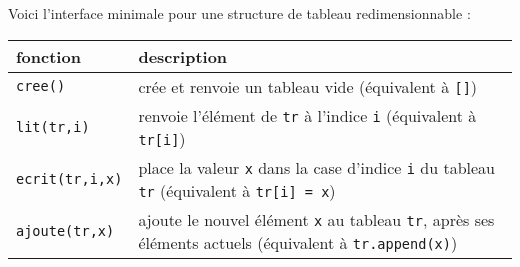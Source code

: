 \documentclass[a4paper,17pt]{extarticle}
\begin{document}
    Voici l'interface minimale pour une structure de tableau
redimensionnable :

\begin{longtable}[]{@{}ll@{}}
\toprule
\begin{minipage}[b]{0.47\columnwidth}\raggedright
fonction\strut
\end{minipage} & \begin{minipage}[b]{0.47\columnwidth}\raggedright
description\strut
\end{minipage}\tabularnewline
\midrule
\endhead
\begin{minipage}[t]{0.47\columnwidth}\raggedright
\texttt{cree()}\strut
\end{minipage} & \begin{minipage}[t]{0.47\columnwidth}\raggedright
crée et renvoie un tableau vide (équivalent à \texttt{{[}{]}})\strut
\end{minipage}\tabularnewline
\begin{minipage}[t]{0.47\columnwidth}\raggedright
\texttt{lit(tr,i)}\strut
\end{minipage} & \begin{minipage}[t]{0.47\columnwidth}\raggedright
renvoie l'élément de \texttt{tr} à l'indice \texttt{i} (équivalent à
\texttt{tr{[}i{]}})\strut
\end{minipage}\tabularnewline
\begin{minipage}[t]{0.47\columnwidth}\raggedright
\texttt{ecrit(tr,i,x)}\strut
\end{minipage} & \begin{minipage}[t]{0.47\columnwidth}\raggedright
place la valeur \texttt{x} dans la case d'indice \texttt{i} du tableau
\texttt{tr} (équivalent à \texttt{tr{[}i{]}\ =\ x})\strut
\end{minipage}\tabularnewline
\begin{minipage}[t]{0.47\columnwidth}\raggedright
\texttt{ajoute(tr,x)}\strut
\end{minipage} & \begin{minipage}[t]{0.47\columnwidth}\raggedright
ajoute le nouvel élément \texttt{x} au tableau \texttt{tr}, après ses
éléments actuels (équivalent à \texttt{tr.append(x)})\strut
\end{minipage}\tabularnewline
\bottomrule
\end{longtable}
\end{document}
